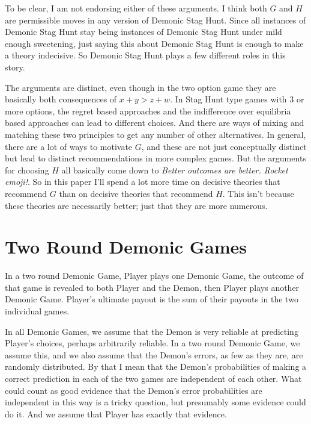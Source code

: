 \documentclass[
  12pt,
]{article}
\begin{document}
To be clear, I am not endorsing either of these arguments. I think both
\(G\) and \(H\) are permissible moves in any version of Demonic Stag
Hunt. Since all instances of Demonic Stag Hunt stay being instances of
Demonic Stag Hunt under mild enough sweetening, just saying this about
Demonic Stag Hunt is enough to make a theory indecisive. So Demonic Stag
Hunt plays a few different roles in this story.

The arguments are distinct, even though in the two option game they are
basically both consequences of \(x + y > z + w\). In Stag Hunt type
games with 3 or more options, the regret based approaches and the
indifference over equilibria based approaches can lead to different
choices. And there are ways of mixing and matching these two principles
to get any number of other alternatives. In general, there are a lot of
ways to motivate \(G\), and these are not just conceptually distinct but
lead to distinct recommendations in more complex games. But the
arguments for choosing \(H\) all basically come down to \emph{Better
outcomes are better. Rocket emoji!}. So in this paper I'll spend a lot
more time on decisive theories that recommend \(G\) than on decisive
theories that recommend \(H\). This isn't because these theories are
necessarily better; just that they are more numerous.

\hypertarget{two-round-demonic-games}{%
\section{Two Round Demonic Games}\label{two-round-demonic-games}}

In a two round Demonic Game, Player plays one Demonic Game, the outcome
of that game is revealed to both Player and the Demon, then Player plays
another Demonic Game. Player's ultimate payout is the sum of their
payouts in the two individual games.

In all Demonic Games, we assume that the Demon is very reliable at
predicting Player's choices, perhaps arbitrarily reliable. In a two
round Demonic Game, we assume this, and we also assume that the Demon's
errors, as few as they are, are randomly distributed. By that I mean
that the Demon's probabilities of making a correct prediction in each of
the two games are independent of each other. What could count as good
evidence that the Demon's error probabilities are independent in this
way is a tricky question, but presumably some evidence could do it. And
we assume that Player has exactly that evidence.
\end{document}
